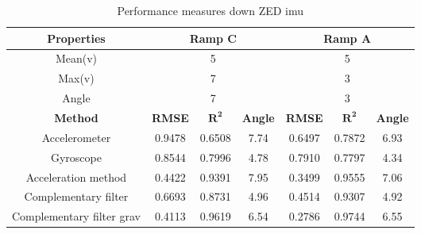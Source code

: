 \begin{table}[htbp]
	\centering
	\caption{Performance measures down ZED \gls{imu}}
	\label{tab:eval_table_imu_down}
	\begin{tabular}[t]{ccccccc}
		\toprule
		\textbf{Properties}       & \multicolumn{3}{c}{\textbf{Ramp C}} & \multicolumn{3}{c}{\textbf{Ramp A}}                                                                    \\
		\midrule
		Mean(v)                   & \multicolumn{3}{c}{5}               & \multicolumn{3}{c}{5}                                                                                  \\
		Max(v)                    & \multicolumn{3}{c}{7}               & \multicolumn{3}{c}{3}                                                                                  \\
		Angle                     & \multicolumn{3}{c}{7}               & \multicolumn{3}{c}{3}                                                                                  \\
		\hline
		\textbf{Method}           & \textbf{RMSE}                       & $\mathbf{R^2}$                      & \textbf{Angle} & \textbf{RMSE} & $\mathbf{R^2}$ & \textbf{Angle} \\
		\cmidrule(lr){2-4}   \cmidrule(lr){5-7}
		Accelerometer             & 0.9478                              & 0.6508                              & 7.74           & 0.6497        & 0.7872         & 6.93           \\
		Gyroscope                 & 0.8544                              & 0.7996                              & 4.78           & 0.7910        & 0.7797         & 4.34           \\
		Acceleration method       & 0.4422                              & 0.9391                              & 7.95           & 0.3499        & 0.9555         & 7.06           \\
		Complementary filter      & 0.6693                              & 0.8731                              & 4.96           & 0.4514        & 0.9307         & 4.92           \\
		Complementary filter grav & 0.4113                              & 0.9619                              & 6.54           & 0.2786        & 0.9744         & 6.55           \\
		\bottomrule
	\end{tabular}
\end{table}




